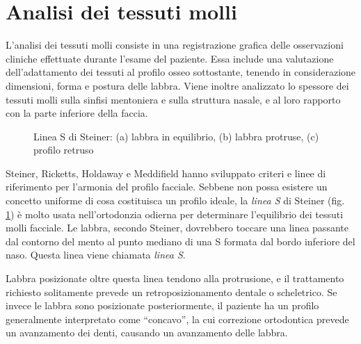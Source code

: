\section{Analisi dei tessuti molli}
L'analisi dei tessuti molli consiste in una registrazione grafica delle osservazioni cliniche effettuate durante l'esame del paziente. Essa include una valutazione dell'adattamento dei tessuti al profilo osseo sottostante, tenendo in considerazione dimensioni, forma e postura delle labbra. Viene inoltre analizzato lo spessore dei tessuti molli sulla sinfisi mentoniera e sulla struttura nasale, e al loro rapporto con la parte inferiore della faccia.

\begin{figure}[h!]
 \centering
 \caption{Linea S di Steiner: (a) labbra in equilibrio, (b) labbra protruse, (c) profilo retruso}
 \label{fig:steiner_linea_s}
\end{figure}

Steiner, Ricketts, Holdaway e Meddifield hanno sviluppato criteri e linee di riferimento per l'armonia del profilo facciale. Sebbene non possa esistere un concetto uniforme di cosa costituisca un profilo ideale, la \textit{linea S} di Steiner (fig. \ref{fig:steiner_linea_s}) è molto usata nell'ortodonzia odierna per determinare l'equilibrio dei tessuti molli facciale. Le labbra, secondo Steiner, dovrebbero toccare una linea passante dal contorno del mento al punto mediano di una S formata dal bordo inferiore del naso. Questa linea viene chiamata \textit{linea S}.

Labbra posizionate oltre questa linea tendono alla protrusione, e il trattamento richiesto solitamente prevede un retroposizionamento dentale o scheletrico. Se invece le labbra sono posizionate posteriormente, il paziente ha un profilo generalmente interpretato come ``concavo'', la cui correzione ortodontica prevede un avanzamento dei denti, causando un avanzamento delle labbra.

\nocite{Steiner1953}
